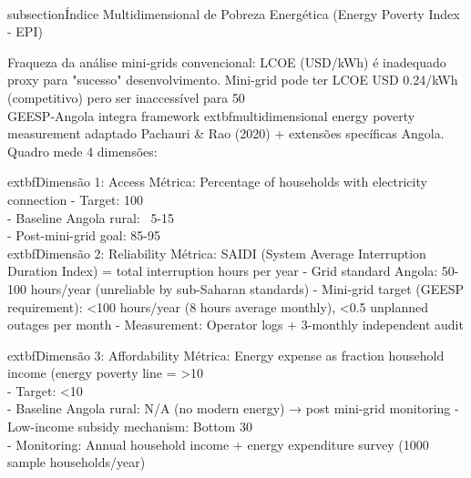 \documentclass[12pt, a4paper]{article}
\begin{document}
{{{{{{{{{{{{\\subsection{Índice Multidimensional de Pobreza Energética (Energy Poverty Index - EPI)}

Fraqueza da análise mini-grids convencional: LCOE (USD/kWh) é inadequado proxy para "sucesso" desenvolvimento. Mini-grid pode ter LCOE USD 0.24/kWh (competitivo) pero ser inaccessível para 50\\%

GEESP-Angola integra framework 	extbf{multidimensional energy poverty measurement} adaptado Pachauri & Rao (2020) + extensões specíficas Angola. Quadro mede 4 dimensões:

	extbf{Dimensão 1: Access}
Métrica: Percentage of households with electricity connection
- Target: 100\\%
- Baseline Angola rural: ~5-15\\%
- Post-mini-grid goal: 85-95\\%

	extbf{Dimensão 2: Reliability}
Métrica: SAIDI (System Average Interruption Duration Index) = total interruption hours per year
- Grid standard Angola: 50-100 hours/year (unreliable by sub-Saharan standards)
- Mini-grid target (GEESP requirement): <100 hours/year (8 hours average monthly), <0.5 unplanned outages per month
- Measurement: Operator logs + 3-monthly independent audit

	extbf{Dimensão 3: Affordability}
Métrica: Energy expense as fraction household income (energy poverty line = >10\\%
- Target: <10\\%
- Baseline Angola rural: N/A (no modern energy) → post mini-grid monitoring
- Low-income subsidy mechanism: Bottom 30\\%
- Monitoring: Annual household income + energy expenditure survey (1000 sample households/year)

}}}}}}}}}}}}
\end{document}
